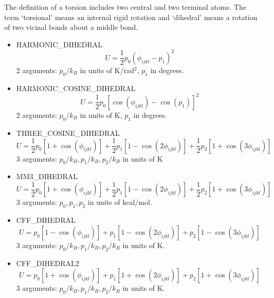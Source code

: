The definition of a torsion includes two central and two terminal atoms. The term `torsional' means
an internal rigid rotation and `dihedral' means a rotation of two vicinal bonds about a middle bond.
\begin{itemize}
  \item{HARMONIC\_DIHEDRAL}\\
  \begin{equation}
  U=\frac{1}{2}p_0\left(\phi_{ijkl}-p_1\right)^2
  \end{equation}
  2 arguments: $p_0/k_B$ in units of K/rad$^2$, $p_1$ in degrees.

  \item{HARMONIC\_COSINE\_DIHEDRAL}\\
  \begin{equation}
  U=\frac{1}{2}p_0\left[\cos\left(\phi_{ijkl}\right)-\cos\left(p_1\right)\right]^2
  \end{equation}
  2 arguments: $p_0/k_B$ in units of K, $p_1$ in degrees.

  \item{THREE\_COSINE\_DIHEDRAL}\\
  \begin{equation}
  U=\frac{1}{2}p_0\left[1+\cos\left(\phi_{ijkl}\right)\right]+
    \frac{1}{2}p_1\left[1-\cos\left(2\phi_{ijkl}\right)\right]+
    \frac{1}{2}p_2\left[1+\cos\left(3\phi_{ijkl}\right)\right]
  \end{equation}
  3 arguments: $p_0/k_B,p_1/k_B,p_2/k_B$ in units of K


  \item{MM3\_DIHEDRAL}\\
  \begin{equation}
  U=\frac{1}{2}p_0\left[1+\cos\left(\phi_{ijkl}\right)\right]+
    \frac{1}{2}p_1\left[1-\cos\left(2\phi_{ijkl}\right)\right]+
    \frac{1}{2}p_2\left[1+\cos\left(3\phi_{ijkl}\right)\right]
  \end{equation}
  3 arguments: $p_0,p_1,p_2$ in units of kcal/mol.

  \item{CFF\_DIHEDRAL}\\
  \begin{equation}
  U=p_0\left[1-\cos\left(\phi_{ijkl}\right)\right]+
    p_1\left[1-\cos\left(2\phi_{ijkl}\right)\right]+
    p_2\left[1-\cos\left(3\phi_{ijkl}\right)\right]
  \end{equation}
  3 arguments: $p_0/k_B,p_1/k_B,p_2/k_B$ in units of K.

  \item{CFF\_DIHEDRAL2}\\
  \begin{equation}
  U=p_0\left[1+\cos\left(\phi_{ijkl}\right)\right]+
    p_1\left[1+\cos\left(2\phi_{ijkl}\right)\right]+
    p_2\left[1+\cos\left(3\phi_{ijkl}\right)\right]
  \end{equation}
  3 arguments: $p_0/k_B,p_1/k_B,p_2/k_B$ in units of K.


\end{itemize}
